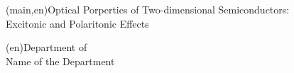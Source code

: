 
%




\nttitle(main,en){Optical Porperties of Two-dimensional Semiconductors:\\Excitonic and Polaritonic Effects}%





\ntdepartment*(en){Department of\\Name of the Department}




